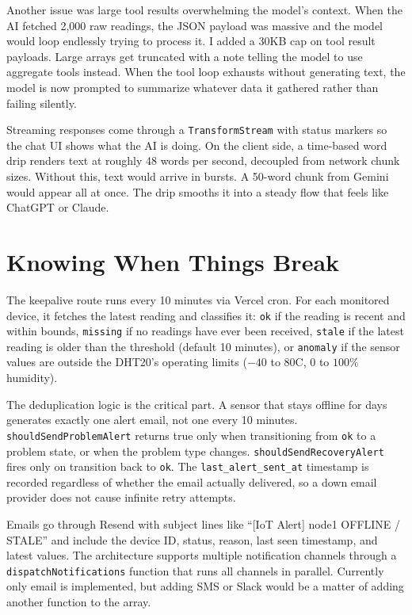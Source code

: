 \documentclass[11pt, letterpaper]{article}
\begin{document}
Another issue was large tool results overwhelming the model's context. When the AI fetched 2,000 raw readings, the JSON payload was massive and the model would loop endlessly trying to process it. I added a 30KB cap on tool result payloads. Large arrays get truncated with a note telling the model to use aggregate tools instead. When the tool loop exhausts without generating text, the model is now prompted to summarize whatever data it gathered rather than failing silently.

Streaming responses come through a \texttt{TransformStream} with status markers so the chat UI shows what the AI is doing. On the client side, a time-based word drip renders text at roughly 48 words per second, decoupled from network chunk sizes. Without this, text would arrive in bursts. A 50-word chunk from Gemini would appear all at once. The drip smooths it into a steady flow that feels like ChatGPT or Claude.


\section{Knowing When Things Break}

The keepalive route runs every 10 minutes via Vercel cron. For each monitored device, it fetches the latest reading and classifies it: \texttt{ok} if the reading is recent and within bounds, \texttt{missing} if no readings have ever been received, \texttt{stale} if the latest reading is older than the threshold (default 10 minutes), or \texttt{anomaly} if the sensor values are outside the DHT20's operating limits ($-40$ to $80$\textdegree C, $0$ to $100$\% humidity).

The deduplication logic is the critical part. A sensor that stays offline for days generates exactly one alert email, not one every 10 minutes. \texttt{shouldSendProblemAlert} returns true only when transitioning from \texttt{ok} to a problem state, or when the problem type changes. \texttt{shouldSendRecoveryAlert} fires only on transition back to \texttt{ok}. The \texttt{last\_alert\_sent\_at} timestamp is recorded regardless of whether the email actually delivered, so a down email provider does not cause infinite retry attempts.

Emails go through Resend with subject lines like ``{[IoT Alert]} node1 OFFLINE / STALE'' and include the device ID, status, reason, last seen timestamp, and latest values. The architecture supports multiple notification channels through a \texttt{dispatchNotifications} function that runs all channels in parallel. Currently only email is implemented, but adding SMS or Slack would be a matter of adding another function to the array.
\end{document}
